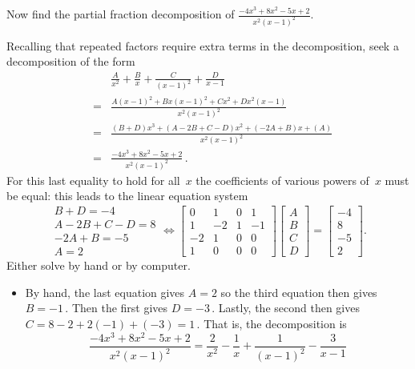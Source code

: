 \begin{example}
Now find the partial fraction decomposition of \(\frac{-4x^3+8x^2-5x+2}{x^2(x-1)^2}\).
\begin{solution} 
Recalling that repeated factors require extra terms in the decomposition, seek a decomposition of the form
\begin{eqnarray*}&&
\frac A{x^2}+\frac B{x}+ \frac C{(x-1)^2} +\frac D{x-1}
\\&=&\frac{A(x-1)^2+Bx(x-1)^2 +Cx^2+ Dx^2(x-1)} {x^2(x-1)^2}
\\&=&\frac{(B+D)x^3+(A-2B+C-D)x^2+(-2A+B)x+(A)} {x^2(x-1)^2}
\\&=&\frac{-4x^3+8x^2-5x+2}{x^2(x-1)^2}\,.
\end{eqnarray*}
For this last equality to hold for all~\(x\) the coefficients of various powers of~\(x\) must be equal: this leads to the linear equation system
\begin{equation*}
\begin{array}{l}
B+D=-4 \\
A-2B+C-D=8 \\
-2A+B=-5\\
A=2
\end{array}
\iff
\begin{bmatrix} 0&1&0&1
\\1&-2&1&-1
\\-2&1&0&0
\\1&0&0&0 \end{bmatrix}\begin{bmatrix} A\\B\\C\\D \end{bmatrix}
=\begin{bmatrix} -4\\8\\-5\\2 \end{bmatrix}.
\end{equation*}
Either solve by hand or by computer.
\begin{itemize}
\item By hand, the last equation gives \(A=2\) so the third equation then gives \(B=-1\)\,.  
Then the first gives \(D=-3\)\,.  
Lastly, the second then gives \(C=8-2+2(-1)+(-3)=1\)\,.  
That is, the decomposition is
\begin{equation*}
\frac{-4x^3+8x^2-5x+2}{x^2(x-1)^2}
=\frac 2{x^2}-\frac 1{x}+ \frac 1{(x-1)^2} -\frac 3{x-1}
\end{equation*}


\end{itemize}
\end{solution}
\end{example}
